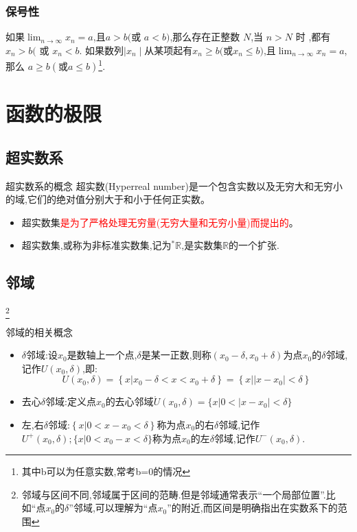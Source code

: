 \documentclass[9pt a4paper, oneside, UTF8]{ctexbook}
\begin{document}
\begin{sloppypar}
    \subsubsection{保号性}
    \begin{defn}{}{}
        如果$\lim_{n\to\infty}x_n=a$,且$a{>}b( $或 $a{<}b)$,那么存在正整数 $N$,当 $n{>}N$ 时 ,都有$x_n{>}b($ 或 $x_n{<}b$.\newline
        如果数列$\mid x_n\mid$从某项起有$x_n\geqslant b($或$x_n\leqslant b)$,且$\lim_{n\to\infty}x_n=a $,那么 $a\geqslant b( 或 a\leqslant b)$\footnote{其中b可以为任意实数,常考b=0的情况}.
    \end{defn}
    \section{函数的极限}
    \subsection{超实数系}
    \begin{defn}{超实数系的概念}{}
        超实数(Hyperreal number)是一个包含实数以及无穷大和无穷小的域,它们的绝对值分别大于和小于任何正实数。
    \end{defn}
    \begin{criterion}{}{}
        \begin{itemize}
            \item 超实数集\textcolor{red}{是为了严格处理无穷量(无穷大量和无穷小量)而提出的}。
            \item 超实数集,或称为非标准实数集,记为$^{*}\mathbb{R}$,是实数集$\mathbb{R}$的一个扩张.
        \end{itemize}
    \end{criterion}
    \subsection{邻域}\footnote{邻域与区间不同,邻域属于区间的范畴.但是邻域通常表示“一个局部位置”.比如“点$x_0$的$\delta$”邻域,可以理解为“点$x_0$”的附近,而区间是明确指出在实数系下的范围}
    \begin{defn}{邻域的相关概念}{}
        \begin{itemize}
            \item $\delta$邻域:设$x_0$是数轴上一个点,$\delta$是某一正数,则称$(x_{0}-\delta,x_{0}+\delta)$为点$x_0$的$\delta$邻域,记作$U(x_{0},\delta)$,即:
                  $$
                      U(x_{0},\delta)=\left\{x|x_{0}-\delta<x<x_{0}+\delta\right\}=\left\{\left.x\right|\left|\left.x-x_{0}\right|<\delta\right\}\right.
                  $$
            \item 去心$\delta$邻域:定义点$x_0$的去心邻域$\mathring{U}(x_{0},\delta)=\bigl\{x|0<\bigl|x-x_{0}\bigr|<\delta\bigr\}$
            \item 左,右$\delta$邻域:$\left\{x|0<x-x_{0}<\delta\right\}$称为点$x_0$的右$\delta$邻域,记作$U^{+}(x_{0},\delta);\{x|0<x_{0}-x<\delta\}$称为点$x_0$的左$\delta$邻域,记作$U^{-}(x_{0},\delta).$
        \end{itemize}
    \end{defn}

\end{sloppypar}
\end{document}
